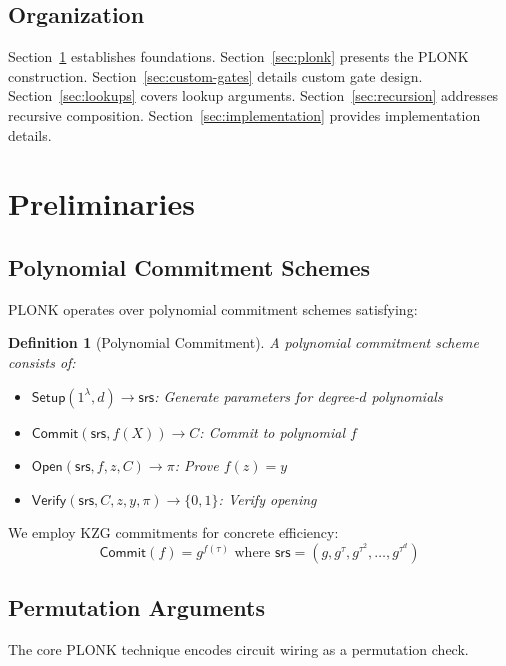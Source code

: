 \documentclass[11pt,a4paper]{article}
\newtheorem{definition}[theorem]{Definition}
\begin{document}
\subsection{Organization}

Section~\ref{sec:preliminaries} establishes foundations. Section~\ref{sec:plonk} presents the PLONK construction. Section~\ref{sec:custom-gates} details custom gate design. Section~\ref{sec:lookups} covers lookup arguments. Section~\ref{sec:recursion} addresses recursive composition. Section~\ref{sec:implementation} provides implementation details.

\section{Preliminaries}
\label{sec:preliminaries}

\subsection{Polynomial Commitment Schemes}

PLONK operates over polynomial commitment schemes satisfying:

\begin{definition}[Polynomial Commitment]
A polynomial commitment scheme consists of:
\begin{itemize}
    \item $\mathsf{Setup}(1^\lambda, d) \to \mathsf{srs}$: Generate parameters for degree-$d$ polynomials
    \item $\mathsf{Commit}(\mathsf{srs}, f(X)) \to C$: Commit to polynomial $f$
    \item $\mathsf{Open}(\mathsf{srs}, f, z, C) \to \pi$: Prove $f(z) = y$
    \item $\mathsf{Verify}(\mathsf{srs}, C, z, y, \pi) \to \{0,1\}$: Verify opening
\end{itemize}
\end{definition}

We employ KZG commitments \cite{kzg} for concrete efficiency:
\[
\mathsf{Commit}(f) = g^{f(\tau)} \text{ where } \mathsf{srs} = (g, g^\tau, g^{\tau^2}, \ldots, g^{\tau^d})
\]

\subsection{Permutation Arguments}

The core PLONK technique encodes circuit wiring as a permutation check.
\end{document}
